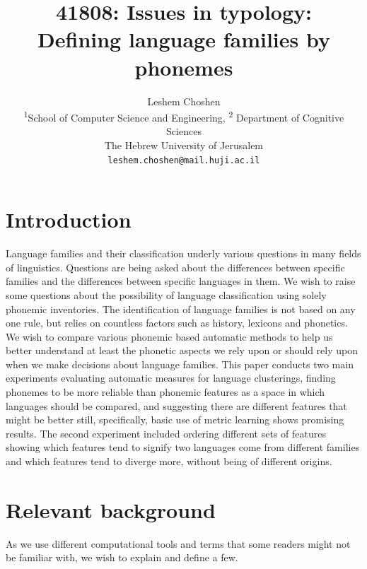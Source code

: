 \documentclass[letterpaper, 11pt]{article}
\begin{document}
\title{41808: Issues in typology:\\Defining language families by phonemes}
\author{
  Leshem Choshen \\
  \textsuperscript{1}School of Computer Science and Engineering,
  \textsuperscript{2} Department of Cognitive Sciences \\
  The Hebrew University of Jerusalem \\
  \texttt{leshem.choshen@mail.huji.ac.il}\\
}
\maketitle
\section{Introduction}
Language families and their classification underly various questions in many fields of linguistics. Questions are being asked about the differences between specific families and the differences between specific languages in them. We wish to raise some questions about the possibility of language classification using solely phonemic inventories. The identification of language families is not based on any one rule, but relies on countless factors such as history, lexicons and phonetics. We wish to compare various phonemic based automatic methods to help us better understand at least the phonetic aspects we rely upon or should rely upon when we make decisions about language families. This paper conducts two main experiments evaluating automatic measures for language clusterings, finding phonemes to be more reliable than phonemic features as a space in which languages should be compared, and suggesting there are different features that might be better still, specifically, basic use of metric learning shows promising results.
The second experiment included ordering different sets of features showing which features tend to signify two languages come from different families and which features tend to diverge more, without being of different origins.

\section{Relevant background}
As we use different computational tools and terms that some readers might not be familiar with, we wish to explain and define a few.
\end{document}
